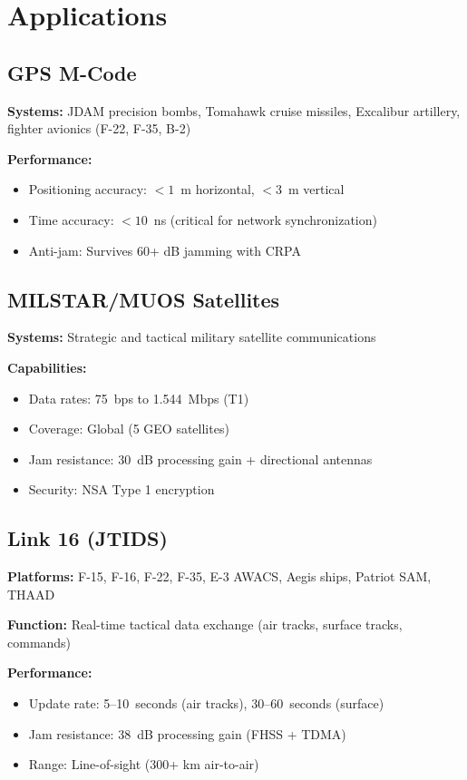 \section{Applications}

\subsection{GPS M-Code}

\textbf{Systems:} JDAM precision bombs, Tomahawk cruise missiles, Excalibur artillery, fighter avionics (F-22, F-35, B-2)

\textbf{Performance:}
\begin{itemize}
\item Positioning accuracy: $<1$~m horizontal, $<3$~m vertical
\item Time accuracy: $<10$~ns (critical for network synchronization)
\item Anti-jam: Survives 60+ dB jamming with CRPA
\end{itemize}

\subsection{MILSTAR/MUOS Satellites}

\textbf{Systems:} Strategic and tactical military satellite communications

\textbf{Capabilities:}
\begin{itemize}
\item Data rates: 75~bps to 1.544~Mbps (T1)
\item Coverage: Global (5 GEO satellites)
\item Jam resistance: 30~dB processing gain + directional antennas
\item Security: NSA Type 1 encryption
\end{itemize}

\subsection{Link 16 (JTIDS)}

\textbf{Platforms:} F-15, F-16, F-22, F-35, E-3 AWACS, Aegis ships, Patriot SAM, THAAD

\textbf{Function:} Real-time tactical data exchange (air tracks, surface tracks, commands)

\textbf{Performance:}
\begin{itemize}
\item Update rate: 5--10~seconds (air tracks), 30--60~seconds (surface)
\item Jam resistance: 38~dB processing gain (FHSS + TDMA)
\item Range: Line-of-sight (300+ km air-to-air)
\end{itemize}

